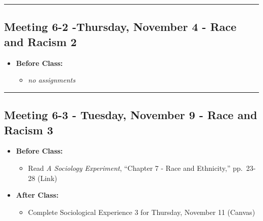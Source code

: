\documentclass[
]{book}
\providecommand{\tightlist}{%
  \setlength{\itemsep}{0pt}\setlength{\parskip}{0pt}}
\begin{document}
\begin{center}\rule{0.5\linewidth}{0.5pt}\end{center}

\hypertarget{meeting-6-2--thursday-november-4---race-and-racism-2}{%
\subsection*{Meeting 6-2 -Thursday, November 4 - Race and Racism 2}\label{meeting-6-2--thursday-november-4---race-and-racism-2}}

\begin{itemize}
\tightlist
\item
  \textbf{Before Class:}

  \begin{itemize}
  \tightlist
  \item
    \emph{no assignments}
  \end{itemize}
\end{itemize}

\begin{center}\rule{0.5\linewidth}{0.5pt}\end{center}

\hypertarget{meeting-6-3---tuesday-november-9---race-and-racism-3}{%
\subsection*{Meeting 6-3 - Tuesday, November 9 - Race and Racism 3}\label{meeting-6-3---tuesday-november-9---race-and-racism-3}}

\begin{itemize}
\tightlist
\item
  \textbf{Before Class:}

  \begin{itemize}
  \tightlist
  \item
    Read \emph{A Sociology Experiment}, ``Chapter 7 - Race and Ethnicity,'' pp.~23-28 (Link)
  \end{itemize}
\item
  \textbf{After Class:}

  \begin{itemize}
  \tightlist
  \item
    Complete Sociological Experience 3 for Thursday, November 11 (Canvas)
  \end{itemize}
\end{itemize}
\end{document}
